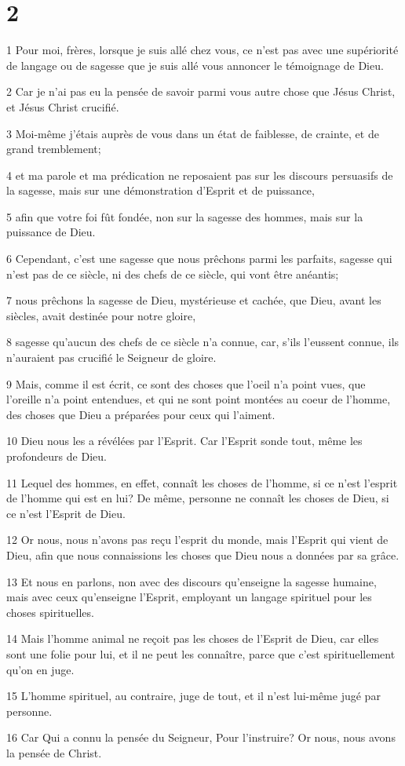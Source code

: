 \chapter{2}

\par 1 Pour moi, frères, lorsque je suis allé chez vous, ce n'est pas avec une supériorité de langage ou de sagesse que je suis allé vous annoncer le témoignage de Dieu.
\par 2 Car je n'ai pas eu la pensée de savoir parmi vous autre chose que Jésus Christ, et Jésus Christ crucifié.
\par 3 Moi-même j'étais auprès de vous dans un état de faiblesse, de crainte, et de grand tremblement;
\par 4 et ma parole et ma prédication ne reposaient pas sur les discours persuasifs de la sagesse, mais sur une démonstration d'Esprit et de puissance,
\par 5 afin que votre foi fût fondée, non sur la sagesse des hommes, mais sur la puissance de Dieu.
\par 6 Cependant, c'est une sagesse que nous prêchons parmi les parfaits, sagesse qui n'est pas de ce siècle, ni des chefs de ce siècle, qui vont être anéantis;
\par 7 nous prêchons la sagesse de Dieu, mystérieuse et cachée, que Dieu, avant les siècles, avait destinée pour notre gloire,
\par 8 sagesse qu'aucun des chefs de ce siècle n'a connue, car, s'ils l'eussent connue, ils n'auraient pas crucifié le Seigneur de gloire.
\par 9 Mais, comme il est écrit, ce sont des choses que l'oeil n'a point vues, que l'oreille n'a point entendues, et qui ne sont point montées au coeur de l'homme, des choses que Dieu a préparées pour ceux qui l'aiment.
\par 10 Dieu nous les a révélées par l'Esprit. Car l'Esprit sonde tout, même les profondeurs de Dieu.
\par 11 Lequel des hommes, en effet, connaît les choses de l'homme, si ce n'est l'esprit de l'homme qui est en lui? De même, personne ne connaît les choses de Dieu, si ce n'est l'Esprit de Dieu.
\par 12 Or nous, nous n'avons pas reçu l'esprit du monde, mais l'Esprit qui vient de Dieu, afin que nous connaissions les choses que Dieu nous a données par sa grâce.
\par 13 Et nous en parlons, non avec des discours qu'enseigne la sagesse humaine, mais avec ceux qu'enseigne l'Esprit, employant un langage spirituel pour les choses spirituelles.
\par 14 Mais l'homme animal ne reçoit pas les choses de l'Esprit de Dieu, car elles sont une folie pour lui, et il ne peut les connaître, parce que c'est spirituellement qu'on en juge.
\par 15 L'homme spirituel, au contraire, juge de tout, et il n'est lui-même jugé par personne.
\par 16 Car Qui a connu la pensée du Seigneur, Pour l'instruire? Or nous, nous avons la pensée de Christ.

